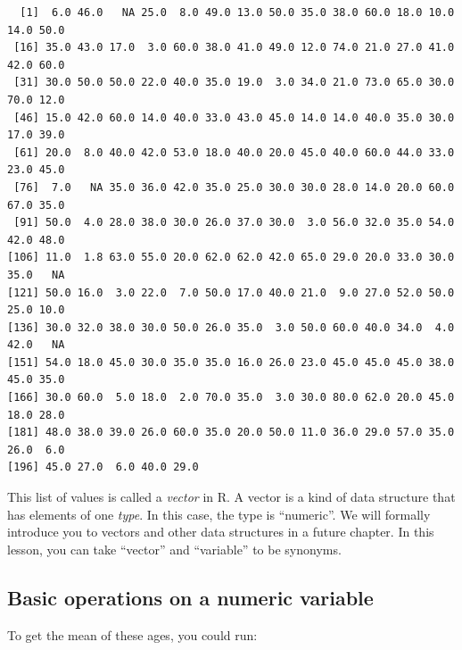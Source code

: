 \documentclass[
  letterpaper,
  DIV=11,
  numbers=noendperiod]{scrreprt}
\begin{document}
\begin{verbatim}
  [1]  6.0 46.0   NA 25.0  8.0 49.0 13.0 50.0 35.0 38.0 60.0 18.0 10.0 14.0 50.0
 [16] 35.0 43.0 17.0  3.0 60.0 38.0 41.0 49.0 12.0 74.0 21.0 27.0 41.0 42.0 60.0
 [31] 30.0 50.0 50.0 22.0 40.0 35.0 19.0  3.0 34.0 21.0 73.0 65.0 30.0 70.0 12.0
 [46] 15.0 42.0 60.0 14.0 40.0 33.0 43.0 45.0 14.0 14.0 40.0 35.0 30.0 17.0 39.0
 [61] 20.0  8.0 40.0 42.0 53.0 18.0 40.0 20.0 45.0 40.0 60.0 44.0 33.0 23.0 45.0
 [76]  7.0   NA 35.0 36.0 42.0 35.0 25.0 30.0 30.0 28.0 14.0 20.0 60.0 67.0 35.0
 [91] 50.0  4.0 28.0 38.0 30.0 26.0 37.0 30.0  3.0 56.0 32.0 35.0 54.0 42.0 48.0
[106] 11.0  1.8 63.0 55.0 20.0 62.0 62.0 42.0 65.0 29.0 20.0 33.0 30.0 35.0   NA
[121] 50.0 16.0  3.0 22.0  7.0 50.0 17.0 40.0 21.0  9.0 27.0 52.0 50.0 25.0 10.0
[136] 30.0 32.0 38.0 30.0 50.0 26.0 35.0  3.0 50.0 60.0 40.0 34.0  4.0 42.0   NA
[151] 54.0 18.0 45.0 30.0 35.0 35.0 16.0 26.0 23.0 45.0 45.0 45.0 38.0 45.0 35.0
[166] 30.0 60.0  5.0 18.0  2.0 70.0 35.0  3.0 30.0 80.0 62.0 20.0 45.0 18.0 28.0
[181] 48.0 38.0 39.0 26.0 60.0 35.0 20.0 50.0 11.0 36.0 29.0 57.0 35.0 26.0  6.0
[196] 45.0 27.0  6.0 40.0 29.0
\end{verbatim}

\begin{tcolorbox}[enhanced jigsaw, titlerule=0mm, colback=white, left=2mm, breakable, opacitybacktitle=0.6, colbacktitle=quarto-callout-note-color!10!white, colframe=quarto-callout-note-color-frame, bottomtitle=1mm, opacityback=0, coltitle=black, arc=.35mm, toptitle=1mm, title=\textcolor{quarto-callout-note-color}{\faInfo}\hspace{0.5em}{Vocab}, leftrule=.75mm, toprule=.15mm, bottomrule=.15mm, rightrule=.15mm]

This list of values is called a \emph{vector} in R. A vector is a kind
of data structure that has elements of one \emph{type}. In this case,
the type is ``numeric''. We will formally introduce you to vectors and
other data structures in a future chapter. In this lesson, you can take
``vector'' and ``variable'' to be synonyms.

\end{tcolorbox}

\subsection{Basic operations on a numeric
variable}\label{basic-operations-on-a-numeric-variable}

To get the mean of these ages, you could run:
\end{document}
